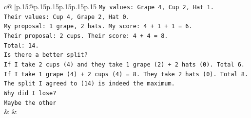 \documentclass{article}
\begin{document}
{\begin{supertabular}{c@{$\;$}|p{.15\linewidth}@{}p{.15\linewidth}p{.15\linewidth}p{.15\linewidth}p{.15\linewidth}p{.15\linewidth}}
{{{\texttt{My values: Grape 4, Cup 2, Hat 1.} \\
\texttt{Their values: Cup 4, Grape 2, Hat 0.} \\
\texttt{My proposal: 1 grape, 2 hats. My score: 4 + 1 + 1 = 6.} \\
\texttt{Their proposal: 2 cups. Their score: 4 + 4 = 8.} \\
\texttt{Total: 14.} \\
\texttt{Is there a better split?} \\
\texttt{If I take 2 cups (4) and they take 1 grape (2) + 2 hats (0). Total 6.} \\
\texttt{If I take 1 grape (4) + 2 cups (4) = 8. They take 2 hats (0). Total 8.} \\
\texttt{The split I agreed to (14) is indeed the maximum.} \\
\texttt{Why did I lose?} \\
\texttt{Maybe the other} \\
            }
        }
    }
    & & \\ \\


\end{supertabular}}
\end{document}
